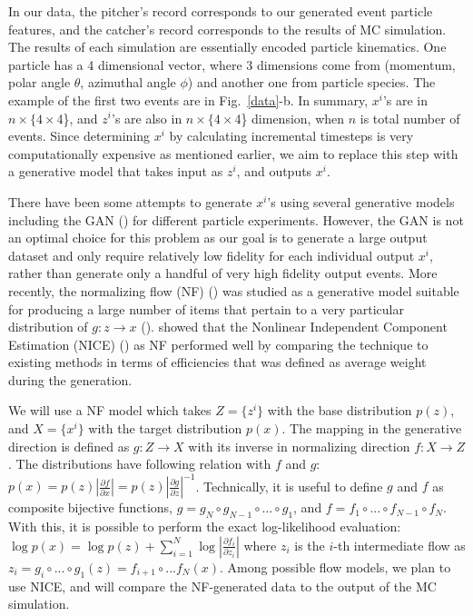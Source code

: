 \documentclass{article}
\begin{document}
In our data, the pitcher's record corresponds to our generated event particle features, and the catcher's record corresponds to the results of MC simulation. The results of each simulation are essentially encoded particle kinematics. One particle has a 4 dimensional vector, where 3 dimensions come from (momentum, polar angle $\theta$, azimuthal angle $\phi$) and another one from particle species. The example of the first two events are in Fig.~\ref{data}-b. In summary, $x^i$'s are in $n\times\{4\times$4\}, and $z^i$'s are also in $n\times\{4\times$4\} dimension, when $n$ is total number of events. Since determining $x^i$ by calculating incremental timesteps is very computationally expensive as mentioned earlier, we aim to replace this step with a generative model that takes input as $z^i$, and outputs $x^i$.

There have been some attempts to generate $x^i$'s using several generative models including the GAN (\citet{Paganini2017}) for different particle experiments. However, the GAN is not an optimal choice for this problem as our goal is to generate a large output dataset and only require relatively low fidelity for each individual output $x^i$, rather than generate only a handful of very high fidelity output events. More recently, the normalizing flow (NF) (\citet{papamakarios2019normalizing}) was studied as a generative model suitable for producing a large number of items that pertain to a very particular distribution of $g: z\rightarrow x$ (\citet{9089305}). \citet{PhysRevD.101.076002} showed that the Nonlinear Independent Component Estimation (NICE) (\citet{Dinh15}) as NF performed well by comparing the technique to existing methods in terms of efficiencies that was defined as average weight during the generation.

We will use a NF model which takes $Z=\{z^i\}$ with the base distribution $p(z)$, and $X=\{x^i\}$ with the target distribution $p(x)$. The mapping in the generative direction is defined as $g:Z\rightarrow X$ with its inverse in normalizing direction $f:X\rightarrow Z$. The distributions have following relation with $f$ and $g$: $p(x)= p(z)|\frac{\partial f}{\partial x}| =  p(z)|\frac{\partial g}{\partial z}|^{-1}$. Technically, it is useful to define $g$ and $f$ as composite bijective functions, $g= g_N \circ g_{N-1}\circ ... \circ g_1$, and $f= f_1 \circ ... \circ f_{N-1} \circ f_N$. With this, it is possible to perform the exact log-likelihood evaluation: $\log p(x) = \log p(z) + \sum\limits_{i=1}^N \log|\frac{\partial f_i}{\partial z_i}|$ where $z_i$ is the $i$-th intermediate flow as $z_i=g_i \circ ... \circ g_1(z) = f_{i+1}\circ ...f_N(x)$. Among possible flow models, we plan to use NICE, and will compare the NF-generated data to the output of the MC simulation.
\end{document}
